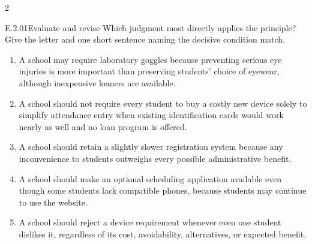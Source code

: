 \documentclass[9pt]{extarticle}
\newcommand{\choice}[1]{\item #1}
\begin{document}
\begin{multicols}{2}
\begin{DenseCoreProblem}{E.2.01}{Evaluate and revise}
Which judgment most directly applies the principle? Give the letter and one short sentence naming the decisive condition match.
\begin{enumerate}[label=(\alph*)]
  \choice{A school may require laboratory goggles because preventing serious eye injuries is more important than preserving students' choice of eyewear, although inexpensive loaners are available.}
  \choice{A school should not require every student to buy a costly new device solely to simplify attendance entry when existing identification cards would work nearly as well and no loan program is offered.}
  \choice{A school should retain a slightly slower registration system because any inconvenience to students outweighs every possible administrative benefit.}
  \choice{A school should make an optional scheduling application available even though some students lack compatible phones, because students may continue to use the website.}
  \choice{A school should reject a device requirement whenever even one student dislikes it, regardless of its cost, avoidability, alternatives, or expected benefit.}
\end{enumerate}
\end{DenseCoreProblem}
\end{multicols}
\CoreWorkArea
\FormBreak
{}
\end{document}
